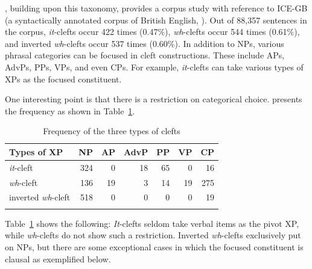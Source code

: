 \noindent \citet{kim:07}, building upon this taxonomy, provides a
corpus study with reference to ICE-GB (a syntactically annotated
corpus of British English, \citealt{nelson:etal:02}). Out of 88,357
sentences in the corpus, \textit{it}-clefts occur 422 times (0.47\%),
\textit{wh}-clefts occur 544 times (0.61\%), and inverted
\textit{wh}-clefts occur 537 times (0.60\%). In addition to NPs,
various phrasal categories can be focused in cleft
constructions. These include APs, AdvPs, PPs, VPs, and even CPs. For
example, \textit{it}-clefts can take various types of XPs as the
focused constituent.





\noindent One interesting point is that there is a restriction on
categorical choice. \citet[220--223]{kim:07} presents the
frequency as shown in Table~\ref{tbl:freq:cleft}.


\begin{table}[!h]
\caption{Frequency of the three types of clefts \citep{kim:07}}   
\centering
\begin{tabular}{lrrrrrr}
\lsptoprule
Types of XP & NP & AP & AdvP & PP & VP & CP \\
\midrule
\textit{it}-cleft & 324 & 0 & 18 & 65 & 0 & 16 \\

\textit{wh}-cleft & 136 & 19 & 3 & 14 & 19 & 275 \\

inverted \textit{wh}-cleft & 518 & 0 & 0 & 0 & 0 & 19 \\
\lspbottomrule
\end{tabular}
\label{tbl:freq:cleft}
\end{table}

Table~\ref{tbl:freq:cleft} shows the following: \textit{It}-clefts
seldom take verbal items as the pivot XP, while \textit{wh}-clefts do
not show such a restriction.  Inverted \textit{wh}-clefts exclusively
put  on NPs, but there are some exceptional cases in which the
focused constituent is clausal as exemplified below.



